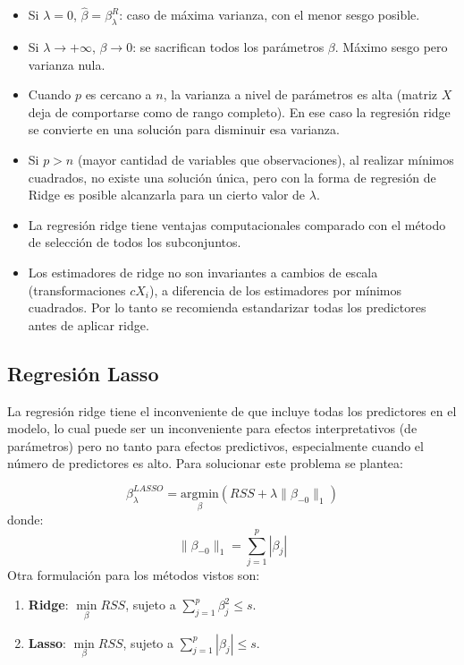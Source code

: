 \documentclass[
  12pt,
]{book}
\providecommand{\tightlist}{%
  \setlength{\itemsep}{0pt}\setlength{\parskip}{0pt}}
\theoremstyle{definition}
\theoremstyle{definition}
\theoremstyle{definition}
\theoremstyle{definition}
\theoremstyle{remark}
\begin{document}
\begin{itemize}
\tightlist
\item
  Si \(\lambda = 0\), \(\hat\beta = \beta^R_\lambda\): caso de máxima varianza, con el menor sesgo posible.
\item
  Si \(\lambda \to +\infty\), \(\beta \to 0\): se sacrifican todos los parámetros \(\beta\). Máximo sesgo pero varianza nula.
\item
  Cuando \(p\) es cercano a \(n\), la varianza a nivel de parámetros es alta (matriz \(X\) deja de comportarse como de rango completo). En ese caso la regresión ridge se convierte en una solución para disminuir esa varianza.
\item
  Si \(p>n\) (mayor cantidad de variables que observaciones), al realizar mínimos cuadrados, no existe una solución única, pero con la forma de regresión de Ridge es posible alcanzarla para un cierto valor de \(\lambda\).
\item
  La regresión ridge tiene ventajas computacionales comparado con el método de selección de todos los subconjuntos.
\item
  Los estimadores de ridge no son invariantes a cambios de escala (transformaciones \(cX_i\)), a diferencia de los estimadores por mínimos cuadrados. Por lo tanto se recomienda estandarizar todas los predictores antes de aplicar ridge.
\end{itemize}

\hypertarget{regresiuxf3n-lasso}{%
\subsection{Regresión Lasso}\label{regresiuxf3n-lasso}}

La regresión ridge tiene el inconveniente de que incluye todas los predictores en el modelo, lo cual puede ser un inconveniente para efectos interpretativos (de parámetros) pero no tanto para efectos predictivos, especialmente cuando el número de predictores es alto. Para solucionar este problema se plantea:

\[ \beta_{\lambda}^{LASSO} = \underset{\beta}{\mathrm{argmin}}\left(RSS + \lambda\|\beta_{-0}\|_1 \right)\]
donde:
\[ \|\beta_{-0}\|_1 = \sum_{j=1}^p|\beta_j|\]
Otra formulación para los métodos vistos son:

\begin{enumerate}
\def\labelenumi{\arabic{enumi}.}
\tightlist
\item
  \textbf{Ridge}: \(\underset{\beta}{\min} RSS\), sujeto a \(\displaystyle\sum_{j=1}^p\beta_j^2 \leq s\).
\item
  \textbf{Lasso}: \(\underset{\beta}{\min} RSS\), sujeto a \(\displaystyle\sum_{j=1}^p|\beta_j| \leq s\).
\end{enumerate}
\end{document}
